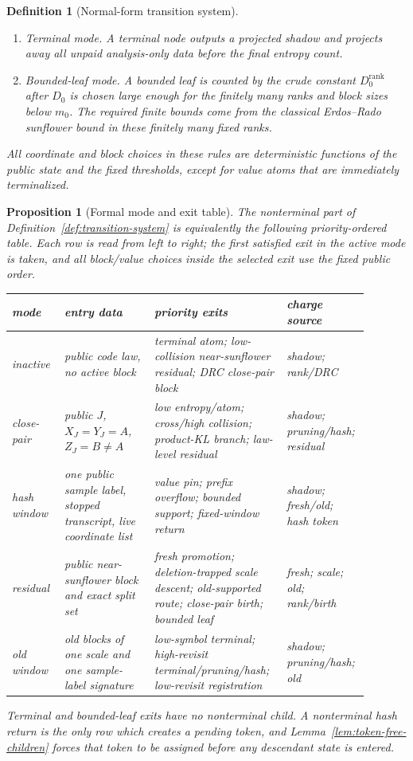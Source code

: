 \documentclass[11pt]{article}
\newtheorem{proposition}[theorem]{Proposition}
\newtheorem{definition}[theorem]{Definition}
\newcommand{\rank}{\operatorname{rank}}
\begin{document}
\begin{definition}[Normal-form transition system]
\begin{enumerate}[label=\textup{(\arabic*)}]
continuation whose non-value transcript has been registered in the
old-incidence ledger or erased by the quotient rule.
Bounded short windows remain in old-window mode through the delayed queue.
\item Terminal mode.  A terminal node outputs a projected shadow and projects
away all unpaid analysis-only data before the final entropy count.
\item Bounded-leaf mode.  A bounded leaf is counted by the crude constant
$D_0^{\rank}$ after $D_0$ is chosen large enough for the finitely many ranks
and block sizes below $m_0$.  The required finite bounds come from the
classical Erdos--Rado sunflower bound in these finitely many fixed ranks.
\end{enumerate}
All coordinate and block choices in these rules are deterministic functions
of the public state and the fixed thresholds, except for value atoms that are
immediately terminalized.
\end{definition}

\begin{proposition}[Formal mode and exit table]
\label{prop:formal-mode-table}
The nonterminal part of Definition~\ref{def:transition-system} is equivalently
the following priority-ordered table.  Each row is read from left to right; the
first satisfied exit in the active mode is taken, and all block/value choices
inside the selected exit use the fixed public order.
\begin{center}
\small
\begin{tabular}{p{0.14\linewidth}p{0.24\linewidth}p{0.35\linewidth}p{0.16\linewidth}}
mode & entry data & priority exits &
charge source\\
\hline
inactive &
public code law, no active block &
terminal atom; low-collision near-sunflower residual; DRC close-pair block &
shadow; rank/DRC\\
close-pair &
public $J$, $X_J=Y_J=A$, $Z_J=B\ne A$ &
low entropy/atom; cross/high collision; product-KL branch; law-level residual &
shadow; pruning/hash; residual\\
hash window &
one public sample label, stopped transcript, live coordinate list &
value pin; prefix overflow; bounded support; fixed-window return &
shadow; fresh/old; hash token\\
residual &
public near-sunflower block and exact split set &
fresh promotion; deletion-trapped scale descent; old-supported route; close-pair birth; bounded leaf &
fresh; scale; old; rank/birth\\
old window &
old blocks of one scale and one sample-label signature &
low-symbol terminal; high-revisit terminal/pruning/hash; low-revisit registration &
shadow; pruning/hash; old
\end{tabular}
\end{center}
Terminal and bounded-leaf exits have no nonterminal child.  A nonterminal hash
return is the only row which creates a pending token, and
Lemma~\ref{lem:token-free-children} forces that token to be assigned before any
descendant state is entered.
\end{proposition}
\end{document}
